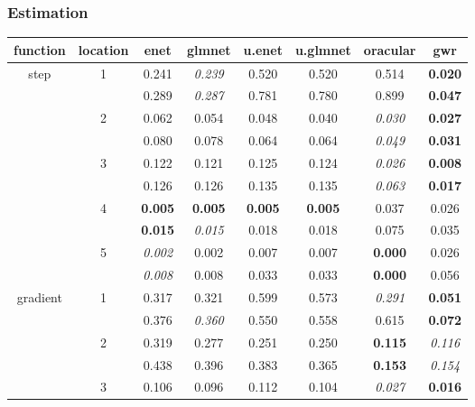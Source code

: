 \documentclass[authoryear, review, 11pt]{elsarticle}
\begin{document}
		\subsubsection{Estimation}
		
\begin{table}
\thispagestyle{empty}
\begin{center}
\begin{tabular}{cccccccc}
 function & location & enet & glmnet & u.enet & u.glmnet & oracular & gwr \\ 
  \hline
  \multirow{10}{*}{step} & \multirow{2}{*}{1} & 0.241 & \emph{0.239} & 0.520 & 0.520 & 0.514 & \textbf{0.020} \\ 
   &  & 0.289 & \emph{0.287} & 0.781 & 0.780 & 0.899 & \textbf{0.047} \\ 
   \cline{3-8}
   & \multirow{2}{*}{2} & 0.062 & 0.054 & 0.048 & 0.040 & \emph{0.030} & \textbf{0.027} \\ 
   &  & 0.080 & 0.078 & 0.064 & 0.064 & \emph{0.049} & \textbf{0.031} \\ 
   \cline{3-8}
   & \multirow{2}{*}{3} & 0.122 & 0.121 & 0.125 & 0.124 & \emph{0.026} & \textbf{0.008} \\ 
   &  & 0.126 & 0.126 & 0.135 & 0.135 & \emph{0.063} & \textbf{0.017} \\ 
   \cline{3-8}
   & \multirow{2}{*}{4} & \textbf{0.005} & \textbf{0.005} & \textbf{0.005} & \textbf{0.005} & 0.037 & 0.026 \\ 
   &  & \textbf{0.015} & \emph{0.015} & 0.018 & 0.018 & 0.075 & 0.035 \\ 
   \cline{3-8}
   & \multirow{2}{*}{5} & \emph{0.002} & 0.002 & 0.007 & 0.007 & \textbf{0.000} & 0.026 \\ 
   &  & \emph{0.008} & 0.008 & 0.033 & 0.033 & \textbf{0.000} & 0.056 \\ 
   \hline
  \multirow{10}{*}{gradient} & \multirow{2}{*}{1} & 0.317 & 0.321 & 0.599 & 0.573 & \emph{0.291} & \textbf{0.051} \\ 
   &  & 0.376 & \emph{0.360} & 0.550 & 0.558 & 0.615 & \textbf{0.072} \\ 
   \cline{3-8}
   & \multirow{2}{*}{2} & 0.319 & 0.277 & 0.251 & 0.250 & \textbf{0.115} & \emph{0.116} \\ 
   &  & 0.438 & 0.396 & 0.383 & 0.365 & \textbf{0.153} & \emph{0.154} \\ 
   \cline{3-8}
   & \multirow{2}{*}{3} & 0.106 & 0.096 & 0.112 & 0.104 & \emph{0.027} & \textbf{0.016} \\ 

\end{tabular}
\end{center}
\end{table}
\end{document}
